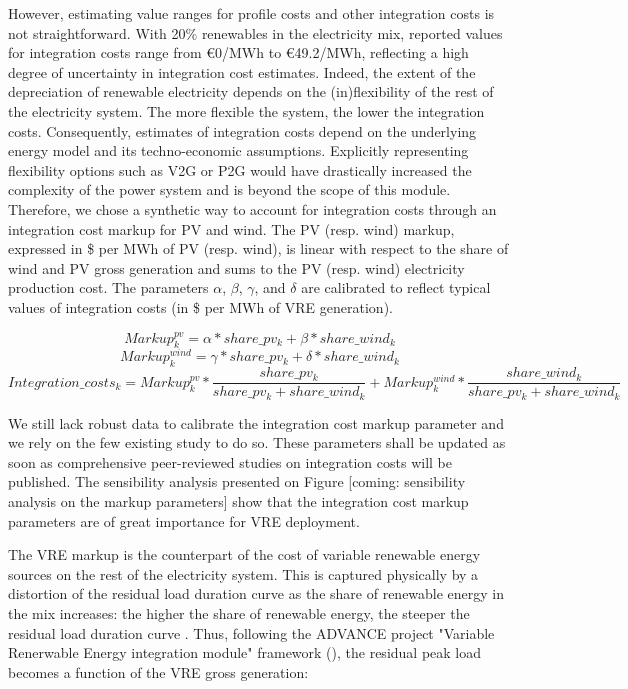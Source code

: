 However, estimating value ranges for profile costs and other integration costs is not straightforward. With 20\% renewables in the electricity mix, reported values for integration costs range from €0/MWh to €49.2/MWh, \cite{Heptonstall2021} reflecting a high degree of uncertainty in integration cost estimates. Indeed, the extent of the depreciation of renewable electricity depends on the (in)flexibility of the rest of the electricity system. The more flexible the system, the lower the integration costs. Consequently, estimates of integration costs depend on the underlying energy model and its techno-economic assumptions. Explicitly representing flexibility options such as V2G or P2G would have drastically increased the complexity of the power system and is beyond the scope of this module. Therefore, we chose a synthetic way to account for integration costs through an integration cost markup for PV and wind. The PV (resp. wind) markup, expressed in \$ per MWh of PV (resp. wind), is linear with respect to the share of wind and PV gross generation and sums to the PV (resp. wind) electricity production cost. The parameters $\alpha$, $\beta$, $\gamma$, and $\delta$ are calibrated to reflect typical values of integration costs (in \$ per MWh of VRE generation).

\begin{dmath}
    Markup^{pv}_k = \alpha * share\_pv_k + \beta * share\_wind_k
\end{dmath}
\begin{dmath}
    Markup^{wind}_k = \gamma * share\_pv_k + \delta * share\_wind_k
\end{dmath}
\begin{dmath}
    Integration\_costs_k = Markup^{pv}_k *
    \frac{share\_pv_k}{share\_pv_k + share\_wind_k} +
    Markup^{wind}_k * \frac{share\_wind_k}{share\_pv_k + share\_wind_k}
\end{dmath}


We still lack robust data to calibrate the integration cost markup parameter and we rely on the few existing study to do so. These parameters shall be updated as soon as comprehensive peer-reviewed studies on integration costs will be published. The sensibility analysis presented on Figure [coming: sensibility analysis on the markup parameters] show that the integration cost markup parameters are of great importance for VRE deployment.

The VRE markup is the counterpart of the cost of variable renewable energy sources on the rest of the electricity system. This is captured physically by a distortion of the residual load duration curve as the share of renewable energy in the mix increases: the higher the share of renewable energy, the steeper the residual load duration curve \cite{Ueckerdt2015}. Thus, following the ADVANCE project "Variable Renerwable Energy integration module" framework (\cite{Ueckerdt2017}), the residual peak load becomes a function of the VRE gross generation:


